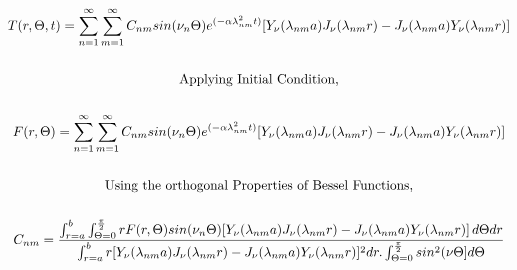 \begin{equation}
    \label{eq:b7}
    \begin{gathered}
    T(r,\Theta,t)=\sum\limits_{n=1}^{\infty} \sum\limits_{m=1}^{\infty} C_{nm} sin(\nu_n \Theta) e^{(-\alpha \lambda_{nm}^2 t)} [Y_\nu(\lambda_{nm}a)J_\nu(\lambda_{nm}r)-J_\nu(\lambda_{nm}a)Y_\nu(\lambda_{nm}r)]\\
    \\
    $Applying Initial Condition,$\\
    \\
    F(r,\Theta)=\sum\limits_{n=1}^{\infty} \sum\limits_{m=1}^{\infty} C_{nm} sin(\nu_n \Theta) e^{(-\alpha \lambda_{nm}^2 t)} [Y_\nu(\lambda_{nm}a)J_\nu(\lambda_{nm}r)-J_\nu(\lambda_{nm}a)Y_\nu(\lambda_{nm}r)]\\
    \\
    $Using the orthogonal Properties of Bessel Functions,$\\
    \\
    C_{nm}=\frac{\int_{r=a}^b\int_{\Theta=0}^{\frac{\pi}{2}}rF(r,\Theta)sin(\nu_n \Theta) [Y_\nu(\lambda_{nm}a)J_\nu(\lambda_{nm}r)-J_\nu(\lambda_{nm}a)Y_\nu(\lambda_{nm}r)]\,d\Theta dr}{\int_{r=a}^br[Y_\nu(\lambda_{nm}a)J_\nu(\lambda_{nm}r)-J_\nu(\lambda_{nm}a)Y_\nu(\lambda_{nm}r)]^2dr.\int_{\Theta=0}^{\frac{\pi}{2}}sin^2(\nu \Theta]d\Theta}
    \end{gathered}
    \end{equation}


